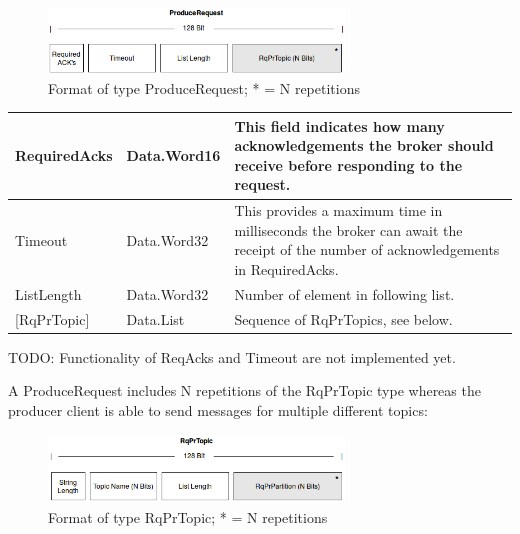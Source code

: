 \begin{figure}[H]
    \centering
    \includegraphics[width=0.7\textwidth]{images/impl-prot-types-produceRequest.png}
    \caption{Format of type ProduceRequest; * = N repetitions }
    \label{fig:impl-prot-types-produceRequest}
\end{figure}

\begin{table}[H]
\centering
\begin{tabular}{ l  l  p{10cm} }
\hline
RequiredAcks  & Data.Word16 & This field indicates how many acknowledgements the broker should receive before responding to the request.                       \\ \hline
Timeout       & Data.Word32 & This provides a maximum time in milliseconds the broker can await the receipt of the number of acknowledgements in RequiredAcks. \\ \hline
ListLength    & Data.Word32 & Number of element in following list.                                                                                             \\ \hline
{[}RqPrTopic{]} & Data.List   & Sequence of RqPrTopics, see below.                                                                                                  \\ \hline
\end{tabular}
\end{table}

TODO: Functionality of ReqAcks and Timeout are not implemented yet. 

A ProduceRequest includes N repetitions of the RqPrTopic type whereas the producer
client is able to send messages for multiple different topics:

\begin{figure}[H]
    \centering
    \includegraphics[width=0.7\textwidth]{images/impl-prot-types-prTopic.png}
    \caption{Format of type RqPrTopic; * = N repetitions }
    \label{fig:impl-prot-types-produceRequest}
\end{figure}

